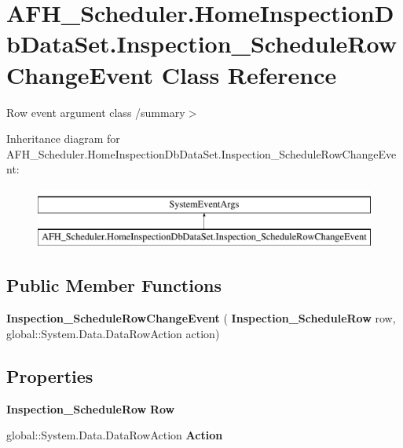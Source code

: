 \section{A\+F\+H\+\_\+\+Scheduler.\+Home\+Inspection\+Db\+Data\+Set.\+Inspection\+\_\+\+Schedule\+Row\+Change\+Event Class Reference}
\label{class_a_f_h___scheduler_1_1_home_inspection_db_data_set_1_1_inspection___schedule_row_change_event}


Row event argument class /summary$>$  


Inheritance diagram for A\+F\+H\+\_\+\+Scheduler.\+Home\+Inspection\+Db\+Data\+Set.\+Inspection\+\_\+\+Schedule\+Row\+Change\+Event\+:\begin{figure}[H]
\begin{center}
\leavevmode
\includegraphics[height=2.000000cm]{class_a_f_h___scheduler_1_1_home_inspection_db_data_set_1_1_inspection___schedule_row_change_event}
\end{center}
\end{figure}
\subsection*{Public Member Functions}
\begin{DoxyCompactItemize}
\item 
\mbox{\label{class_a_f_h___scheduler_1_1_home_inspection_db_data_set_1_1_inspection___schedule_row_change_event_a4f9d8e6d86277d40480423be533959e5}} 
{\bfseries Inspection\+\_\+\+Schedule\+Row\+Change\+Event} (\textbf{ Inspection\+\_\+\+Schedule\+Row} row, global\+::\+System.\+Data.\+Data\+Row\+Action action)
\end{DoxyCompactItemize}
\subsection*{Properties}
\begin{DoxyCompactItemize}
\item 
\mbox{\label{class_a_f_h___scheduler_1_1_home_inspection_db_data_set_1_1_inspection___schedule_row_change_event_a4446a348f683bd2459d1ab9a9dc494ed}} 
\textbf{ Inspection\+\_\+\+Schedule\+Row} {\bfseries Row}\hspace{0.3cm}{\ttfamily  [get]}
\item 
\mbox{\label{class_a_f_h___scheduler_1_1_home_inspection_db_data_set_1_1_inspection___schedule_row_change_event_a2f34915d85b1181ff74318f2c5ef973b}} 
global\+::\+System.\+Data.\+Data\+Row\+Action {\bfseries Action}\hspace{0.3cm}{\ttfamily  [get]}
\end{DoxyCompactItemize}


